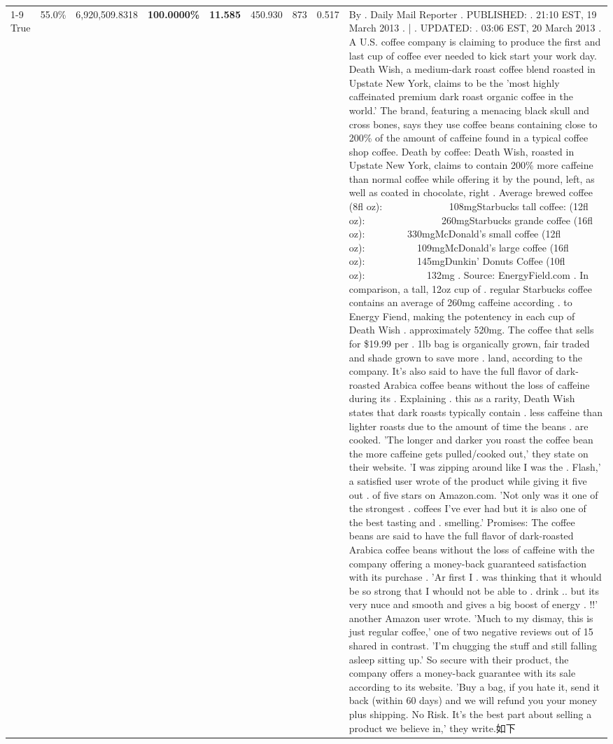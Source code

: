 \begin{table}[H]
{\begin{tabular}{lllrlllll}
\cline{1-9}
True & 55.0\% & 6,920,509.8318 & \bfseries \color{red} 100.0000\% & \bfseries \color{red} 11.585 & 450.930 & 873 & 0.517 & By . Daily Mail Reporter . PUBLISHED: . 21:10 EST, 19 March 2013 . | . UPDATED: . 03:06 EST, 20 March 2013 . A U.S. coffee company is claiming to produce the first and last cup of coffee ever needed to kick start your work day. Death Wish, a medium-dark roast coffee blend roasted in Upstate New York, claims to be the 'most highly caffeinated premium dark roast organic coffee in the world.' The brand, featuring a menacing black skull and cross bones, says they use coffee beans containing close to 200\% of the amount of caffeine found in a typical coffee shop coffee. Death by coffee: Death Wish, roasted in Upstate New York, claims to contain 200\% more caffeine than normal coffee while offering it by the pound, left, as well as coated in chocolate, right . Average brewed coffee (8fl oz):              108mgStarbucks tall coffee: (12fl oz):                260mgStarbucks grande coffee (16fl oz):         330mgMcDonald's small coffee (12fl oz):           109mgMcDonald's large coffee (16fl oz):           145mgDunkin' Donuts Coffee (10fl oz):             132mg . Source: EnergyField.com . In comparison, a tall, 12oz cup of . regular Starbucks coffee contains an average of 260mg caffeine according . to Energy Fiend, making the potentency in each cup of Death Wish . approximately 520mg. The coffee that sells for \$19.99 per . 1lb bag is organically grown, fair traded and shade grown to save more . land, according to the company. It's also said to have the full flavor of dark-roasted Arabica coffee beans without the loss of caffeine during its . Explaining . this as a rarity, Death Wish states that dark roasts typically contain . less caffeine than lighter roasts due to the amount of time the beans . are cooked. 'The longer and darker you roast the coffee bean the more caffeine gets pulled/cooked out,' they state on their website. 'I was zipping around like I was the . Flash,' a satisfied user wrote of the product while giving it five out . of five stars on Amazon.com. 'Not only was it one of the strongest . coffees I've ever had but it is also one of the best tasting and . smelling.’ Promises: The coffee beans are said to have the full flavor of dark-roasted Arabica coffee beans without the loss of caffeine with the company offering a money-back guaranteed satisfaction with its purchase . 'Ar first I . was thinking that it whould be so strong that I whould not be able to . drink .. but its very nuce and smooth and gives a big boost of energy . !!' another Amazon user wrote. 'Much to my dismay, this is just regular coffee,' one of two negative reviews out of 15 shared in contrast. 'I'm chugging the stuff and still falling asleep sitting up.' So secure with their product, the company offers a money-back guarantee with its sale according to its website. 'Buy a bag, if you hate it, send it back (within 60 days) and we will refund you your money plus shipping. No Risk. It’s the best part about selling a product we believe in,' they write.如下 \\

\end{tabular}}
\end{table}
